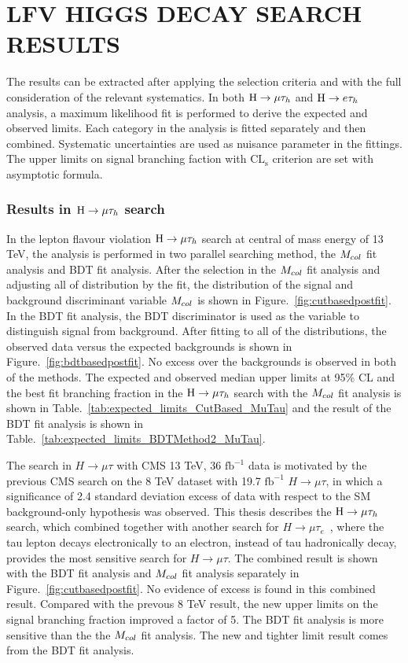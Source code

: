 \chapter{LFV HIGGS DECAY SEARCH RESULTS}

The results can be extracted after applying the selection criteria and with the full consideration of the relevant systematics.  In both $\mathrm{H}\to \mu\tau_{h}$ and $\mathrm{H} \to e \tau_{h}$ analysis, a maximum likelihood fit is performed to derive the expected and observed limits.  Each category in the analysis is fitted separately and then combined. Systematic uncertainties are used as nuisance parameter in the fittings.  The upper limits on signal branching faction with $\textrm{CL}_{\textrm{s}}$ criterion are set with asymptotic formula. 

\subsection{Results in $\mathrm{H}\to \mu\tau_{h}$ search}

In the lepton flavour violation $\mathrm{H}\to \mu\tau_{h}$ search at central of mass energy of 13 TeV, the analysis is performed in two parallel searching method, the $M_{col}$ fit analysis and BDT fit analysis. After the selection in the $M_{col}$ fit analysis and adjusting all of distribution by the fit,  the distribution of the signal and background discriminant variable $M_{col}$ is shown in Figure.~\ref{fig:cutbasedpostfit}. In the BDT fit analysis, the BDT discriminator is used as the variable to distinguish signal from background.  After fitting to all of the distributions, the observed data versus the expected backgrounds is shown in Figure.~\ref{fig:bdtbasedpostfit}. No excess over the backgrounds is observed in both of the methods. The expected and observed median upper limits at 95\% CL and the best fit branching fraction in the $\mathrm{H}\to \mu\tau_{h}$ search with the $M_{col}$ fit analysis is shown in Table.~\ref{tab:expected_limits_CutBased_MuTau}  and the result of the BDT fit analysis is shown in Table.~\ref{tab:expected_limits_BDTMethod2_MuTau}. 

The search in $H \to \mu \tau$ with CMS 13 TeV, 36 $\textrm{fb}^{-1}$ data is motivated by the previous CMS search on the 8 TeV dataset with 19.7 $\textrm{fb}^{-1}$ $H \to \mu \tau$, in which a significance of 2.4 standard deviation excess of data with respect to the SM background-only hypothesis was observed. This thesis describes the $\mathrm{H}\to \mu\tau_{h}$ search, which combined together with another search for $H \to \mu\tau_{e}$~\cite{paper:13TeVsearch}, where the tau lepton decays electronically to an electron, instead of tau hadronically decay, provides the most sensitive search for $H \to \mu \tau$. The combined result is shown with the BDT fit analysis and $M_{col}$ fit analysis separately in Figure.~\ref{fig:cutbasedpostfit}. No evidence of excess is found in this combined result. Compared with the prevous 8 TeV result, the new upper limits on the signal branching fraction improved a factor of 5. The BDT fit analysis is more sensitive than the the $M_{col}$ fit analysis. The new and tighter limit result comes from the BDT fit analysis.  

